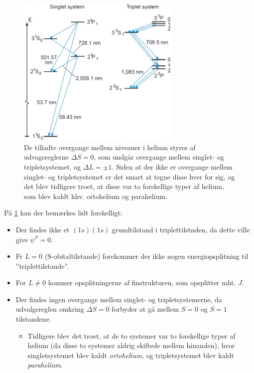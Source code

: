 \begin{figure}[!h]
    \centering
    \includegraphics[width=0.7\textwidth]{Q11/images/SingletOgtripletTilstandeIHelium.PNG}
    \caption{De tilladte overgange mellem niveauer i helium styres af udvagsreglerne $\Delta S = 0$, som undgår overgange mellem singlet- og tripletsystemet, og $\Delta L = \pm 1$. Siden at der ikke er overgange mellem singlet- og tripletsystemet er det smart at tegne disse hver for sig, og det blev tidligere troet, at disse var to forskellige typer af helium, som blev kaldt hhv. ortohelium og parahelium.}
    \label{fig:Q11_SingletOgTripletTilstandeIHelium}
\end{figure}

På \cref{fig:Q11_SingletOgTripletTilstandeIHelium} kan der bemærkes lidt forskelligt:
\begin{itemize}
    \item Der findes ikke et $(1s)(1s)$ grundtilstand i triplettilstnden, da dette ville give $\psi^S = 0$.
    \item Fr $L = 0$ (S-obitaltilstande) forekommer der ikke nogen energiopsplitning til ''triplettilstande''.
    \item For $L \ne 0$ kommer opsplitningerne af finstrukturen, som opsplitter mht. $J$.
    \item Der findes ingen overgange mellem singlet- og tripletsystemerne, da udvalgsreglen omkring $\Delta S = 0$ forbyder at gå mellem $S = 0$ og $S = 1$ tilstandene.
    \begin{itemize}
        \item Tidligere blev det troet, at de to systemer var to forskellige typer af helium (da disse to systemer aldrig skiftede mellem hinanden), hvor singletsystemet blev kaldt \emph{ortohelium}, og tripletsystemet blev kaldt \emph{parahelium}.
    \end{itemize}
\end{itemize}
